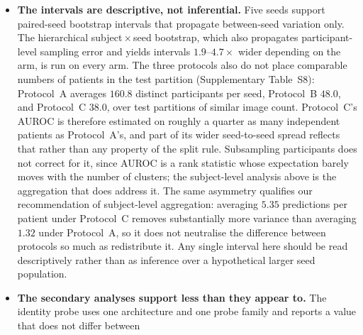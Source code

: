 \documentclass[11pt]{article}
\begin{document}
\begin{itemize}
          test scans whose label comes from an exact visit key gives a
          gap of \AdniGapExactKey{}; that tests the labels the gap is
          scored against, not the ones it was trained on, since the
          date-proximity scans remain in the training partition. The
          exact-linkage arm closes that half by retraining on the $841$
          exact-key scans alone (the table in the main manuscript), and
          the total gap is unchanged, so neither the labels the models
          learned from nor the labels they were scored against carry
          the result.
          \item \textbf{The intervals are descriptive, not inferential.}
          Five seeds support paired-seed bootstrap intervals that
          propagate between-seed variation only. The hierarchical
          subject\,$\times$\,seed bootstrap, which also propagates
          participant-level sampling error and yields intervals
          $1.9$--$4.7\times$ wider depending on the arm, is run on every arm. The three
          protocols also do not
          place comparable numbers of patients in the test partition
          (Supplementary Table~S8): Protocol~A averages
          $160.8$ distinct participants per seed, Protocol~B $48.0$,
          and Protocol~C $38.0$, over test partitions of similar image
          count. Protocol~C's AUROC is therefore estimated on roughly a
          quarter as many independent patients as Protocol~A's, and part
          of its wider seed-to-seed spread reflects that rather than
          any property of the split rule. Subsampling participants does
          not correct for it, since AUROC is a rank statistic whose
          expectation barely moves with the number of clusters; the
          subject-level analysis above is the aggregation that does
          address it. The same asymmetry qualifies
          our recommendation of subject-level aggregation: averaging
          $5.35$ predictions per patient under Protocol~C removes
          substantially more variance than averaging $1.32$ under
          Protocol~A, so it does not neutralise the difference between
          protocols so much as redistribute it. Any single interval here should be read
          descriptively rather than as inference over a hypothetical
          larger seed population.
          \item \textbf{The secondary analyses support less than they
          appear to.} The identity probe uses one architecture and one
          probe family and reports a value that does not differ between

\end{itemize}
\end{document}
